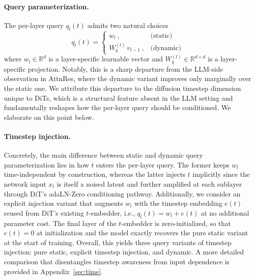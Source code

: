 \documentclass[]{ant_tech_report}
\begin{document}
\paragraph{Query parameterization.} The per-layer query $q_l(t)$ admits two natural choices
\begin{equation}
    q_l(t) = \begin{cases}
        w_l \ , & \text{(static)} \\[2pt]
        W_q^{(l)}\, v_{l-1} \ , & \text{(dynamic)}
    \end{cases}
\end{equation}
where $w_l \in \mathbb{R}^d$ is a layer-specific learnable vector and $W_q^{(l)} \in \mathbb{R}^{d \times d}$ is a layer-specific projection. Notably, this is a sharp departure from the LLM-side observation in AttnRes, where the dynamic variant improves only marginally over the static one. We attribute this departure to the diffusion timestep dimension unique to DiTs, which is a structural feature absent in the LLM setting and fundamentally reshapes how the per-layer query should be conditioned. We elaborate on this point below.

\paragraph{Timestep injection.} Concretely, the main difference between static and dynamic query parameterization lies in how $t$ enters the per-layer query. The former keeps $w_l$ time-independent by construction, whereas the latter injects $t$ implicitly since the network input $x_t$ is itself a noised latent and further amplified at each sublayer through DiT's adaLN-Zero conditioning pathway. Additionally, we consider an explicit injection variant that augments $w_l$ with the timestep embedding $e(t)$ reused from DiT's existing $t$-embedder, i.e., $q_l(t) = w_l + e(t)$ at no additional parameter cost. The final layer of the $t$-embedder is zero-initialized, so that $e(t)=0$ at initialization and the model exactly recovers the pure static variant at the start of training. Overall, this yields three query variants of timestep injection: pure static, explicit timestep injection, and dynamic. A more detailed comparison that disentangles timestep awareness from input dependence is provided in Appendix~\ref{sec:time}.
\end{document}
